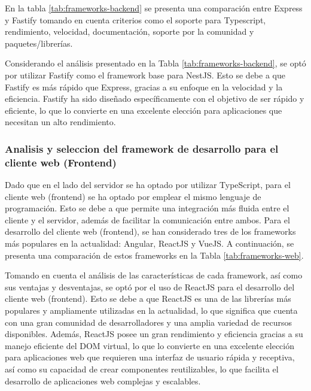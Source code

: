 En la tabla \ref{tab:frameworks-backend} se presenta una comparación entre Express y Fastify tomando en cuenta
criterios como el soporte para Typescript, rendimiento, velocidad, documentación, soporte por la comunidad y
paquetes/librerías.



Considerando el análisis presentado en la Tabla \ref{tab:frameworks-backend}, se optó por utilizar Fastify como
el framework base para NestJS. Esto se debe a que Fastify es más rápido que Express, gracias a su enfoque en la
velocidad y la eficiencia. Fastify ha sido diseñado específicamente con el objetivo de ser rápido y eficiente,
lo que lo convierte en una excelente elección para aplicaciones que necesitan un alto rendimiento.

\subsubsection{Analisis y seleccion del framework de desarrollo para el cliente web (Frontend)}

Dado que en el lado del servidor se ha optado por utilizar TypeScript, para el cliente web (frontend) se ha optado
por emplear el mismo lenguaje de programación. Esto se debe a que permite una integración más fluida entre el
cliente y el servidor, además de facilitar la comunicación entre ambos. Para el desarrollo del cliente web
(frontend), se han considerado tres de los frameworks más populares en la actualidad: Angular, ReactJS y VueJS.
A continuación, se presenta una comparación de estos frameworks en la Tabla \ref{tab:frameworks-web}.






Tomando en cuenta el análisis de las características de cada framework, así como sus ventajas y desventajas, se
optó por el uso de ReactJS para el desarrollo del cliente web (frontend). Esto se debe a que ReactJS es una de
las librerías más populares y ampliamente utilizadas en la actualidad, lo que significa que cuenta con una gran
comunidad de desarrolladores y una amplia variedad de recursos disponibles. Además, ReactJS posee un gran
rendimiento y eficiencia gracias a su manejo eficiente del DOM virtual, lo que lo convierte en una excelente
elección para aplicaciones web que requieren una interfaz de usuario rápida y receptiva, así como su capacidad
de crear componentes reutilizables, lo que facilita el desarrollo de aplicaciones web complejas y escalables.

